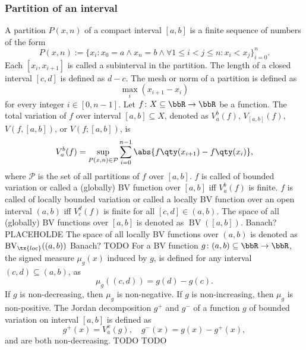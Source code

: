 \subsubsection{Partition of an interval}
A partition $P(x, n)$ of a compact interval $[a,b]$ is a finite sequence of numbers of the form
\[P(x, n):=\{x_i\colon x_0=a\land x_n=b\land\forall 1\leq i<j\leq n\colon x_i<x_j\}_{i=0}^n.\]
Each $[x_i, x_{i+1}]$ is called a subinterval in the partition. The length of a closed interval $[c,d]$ is defined as $d-c$. The mesh or norm of a partition is defined as
\[\max_i\left(x_{i+1}-x_{i}\right)\]
for every integer $i\in [0,n-1]$.
Let $f\colon X\subseteq\bbR\to\bbR$ be a function. The total variation of $f$ over interval $[a,b]\subseteq X$, denoted as $V_a^b(f)$, $V_{[a,b]}(f)$, $V(f,[a,b])$, or $V(f;[a,b])$, is
\[V_a^b(f)=\sup_{P(x,n)\in\mathcal{P}}\sum_{i=0}^{n-1}\abs{f\qty(x_{i+1})-f\qty(x_i)},\]
where $\mathcal{P}$ is the set of all partitions of $f$ over $[a,b]$.
$f$ is called of bounded variation or called a (globally) BV function over $[a,b]$ iff $V_a^b(f)$ is finite.
$f$ is called of locally bounded variation or called a locally BV function over an open interval $(a,b)$ iff $V_c^d(f)$ is finite for all $[c,d]\in (a,b)$.
The space of all (globally) BV functions over $[a,b]$ is denoted as $\operatorname{BV}([a,b])$.
Banach?
PLACEHOLDE 
The space of all locally BV functions over $(a,b)$ is denoted as $\operatorname{BV}_{\tx{loc}}((a,b))$
Banach?
TODO
For a BV function $g\colon(a,b)\subseteq\bbR\to\bbR$, the signed measure $\mu_g(x)$ induced by $g$, is defined for any interval $(c,d)\subseteq (a,b)$, as
\[\mu_g((c,d))=g(d)-g(c).\]
If $g$ is non-decreasing, then $\mu_g$ is non-negative. If $g$ is non-increasing, then $\mu_g$ is non-positive.
The Jordan decomposition $g^+$ and $g^-$ of a function $g$ of bounded variation on interval $[a,b]$ is defined as
\[g^+(x)=V_a^x(g),\quad g^-(x)=g(x)-g^+(x),\]
and are both non-decreasing.
TODO
TODO
